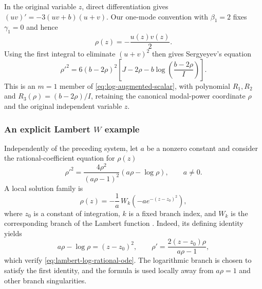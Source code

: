 \documentclass[11pt,a4paper]{article}
\numberwithin{equation}{section}
\begin{document}
In the original variable $z$, direct differentiation gives $(uv)'=-3(uv+b)(u+v)$. Our one-mode convention with $\beta_1=2$ fixes $\gamma_1=0$ and hence
\begin{equation}
    \rho(z)=-\frac{u(z)v(z)}{2}.
\end{equation}
Using the first integral to eliminate $(u+v)^2$ then gives Sergyeyev's equation
\begin{equation}
    \rho'^2=6(b-2\rho)^2\left[
        J-2\rho-b\log\left(\frac{b-2\rho}{I}\right)
    \right].
    \label{eq:sergyeyev-log-scalar}
\end{equation}
This is an $m=1$ member of \eqref{eq:log-augmented-scalar}, with polynomial $R_1,R_2$ and $R_3(\rho)=(b-2\rho)/I$, retaining the canonical modal-power coordinate $\rho$ and the original independent variable $z$.

\subsubsection{An explicit Lambert \texorpdfstring{$W$}{W} example}
\label{sec:lambert-log-example}

Independently of the preceding system, let $a$ be a nonzero constant and consider the rational-coefficient equation for $\rho(z)$
\begin{equation}
    \rho'^2=\frac{4\rho^2}{(a\rho-1)^2}\left(a\rho-\log \rho\right),
    \qquad a\ne0.
    \label{eq:lambert-log-rational-ode}
\end{equation}
A local solution family is
\begin{equation}
    \rho(z)=-\frac1a\,
    W_k\left(-a e^{-(z-z_0)^2}\right),
    \label{eq:lambert-log-explicit-solution}
\end{equation}
where $z_0$ is a constant of integration, $k$ is a fixed branch index, and $W_k$ is the corresponding branch of the Lambert function \cite{corlessLambertWFunction1996}. Indeed, its defining identity yields
\begin{equation}
    a\rho-\log \rho=(z-z_0)^2,\qquad
    \rho'=\frac{2(z-z_0)\rho}{a\rho-1},
\end{equation}
which verify \eqref{eq:lambert-log-rational-ode}. The logarithmic branch is chosen to satisfy the first identity, and the formula is used locally away from $a\rho=1$ and other branch singularities.
\end{document}
